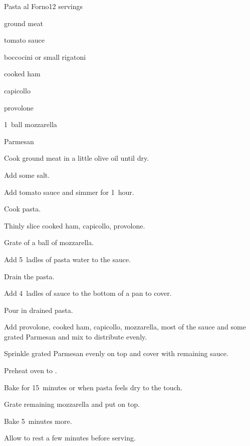 \begin{recipe}{Pasta al Forno}{}{12 servings}

\begin{ingredients}
\item \lbs{1\half} ground meat
\item {} tomato sauce
\item {} boccocini or small rigatoni
\item {} cooked ham
\item {} capicollo
\item {} provolone
\item 1~ball mozzarella
\item Parmesan
\end{ingredients}

\begin{directions}
\item Cook ground meat in a little olive oil until dry.
\item Add some salt.
\item Add tomato sauce and simmer for 1~hour.
\item Cook pasta.
\item Thinly slice cooked ham, capicollo, provolone.
\item Grate \threequarter{} of a ball of mozzarella.
\item Add 5~ladles of pasta water to the sauce.
\item Drain the pasta.
\item Add 4~ladles of sauce to the bottom of a pan to cover.
\item Pour in drained pasta.
\item Add provolone, cooked ham, capicollo, mozzarella, most of the sauce and some grated Parmesan and mix to distribute evenly.
\item Sprinkle grated Parmesan evenly on top and cover with remaining sauce.
\item Preheat oven to .
\item Bake for 15~minutes or when pasta feels dry to the touch.
\item Grate remaining mozzarella and put on top.
\item Bake 5~minutes more.
\item Allow to rest a few minutes before serving.
\end{directions}

\end{recipe}
